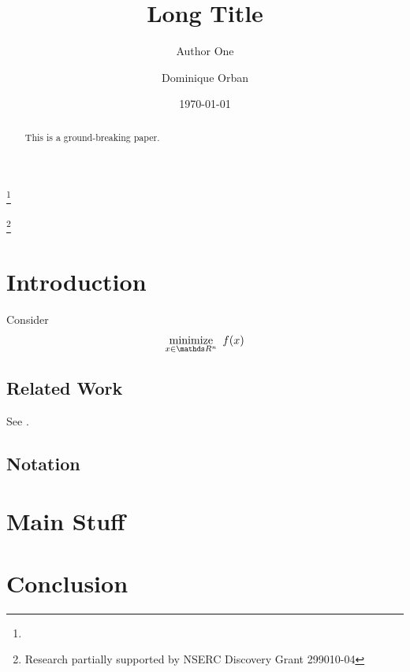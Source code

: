 \documentclass{amsart}
\begin{document}
\linenumbers

\title[Short Title]{%
  Long Title
}

\author[A. One]{Author One}
\address{%
  Some Lab, Some Univeristy, Some Place
}
\thanks{}

\author[D. Orban]{Dominique Orban}
\address{%
  GERAD and
  Mathematics and Industrial Engineering Department \\
  \'Ecole Polytechnique, Montr\'eal, Canada
}
\thanks{Research partially supported by NSERC Discovery Grant 299010-04}



\date{\today}

\begin{abstract}
  This is a ground-breaking paper.
\end{abstract}

\maketitle

\pagestyle{myheadings}

\tableofcontents
\listoftodos\relax   %

\section{Introduction}

Consider
\begin{equation}
  \label{eq:nlp}
  \minimize{x \in  \R^n} \ f(x)
\end{equation}

\subsection*{Related Work}

See \citet{wright-orban-2002}.

\subsection*{Notation}


\section{Main Stuff}

\section{Conclusion}



\end{document}
